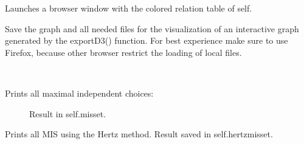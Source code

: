 \documentclass[letterpaper,10pt,english]{sphinxmanual}
\begin{document}
\begin{fulllineitems}
\begin{fulllineitems}
\end{fulllineitems}


\begin{fulllineitems}
\label{techDoc:digraphs.Digraph.showHTMLRelationTable}
Launches a browser window with the colored relation table of self.

\end{fulllineitems}


\begin{fulllineitems}
\label{techDoc:digraphs.Digraph.showInteractiveGraph}
Save the graph and all needed files for the visualization of an interactive graph generated by the exportD3() function.
For best experience make sure to use Firefox, because other browser restrict the loading of local files.

\end{fulllineitems}


\begin{fulllineitems}
\label{techDoc:digraphs.Digraph.showMIS}~\begin{description}
\item[{Prints all maximal independent choices:}] \leavevmode
Result in self.misset.

\end{description}

\end{fulllineitems}


\begin{fulllineitems}
\label{techDoc:digraphs.Digraph.showMIS_AH}
Prints all MIS using the Hertz method.
Result saved in self.hertzmisset.

\end{fulllineitems}



\end{fulllineitems}
\end{document}
